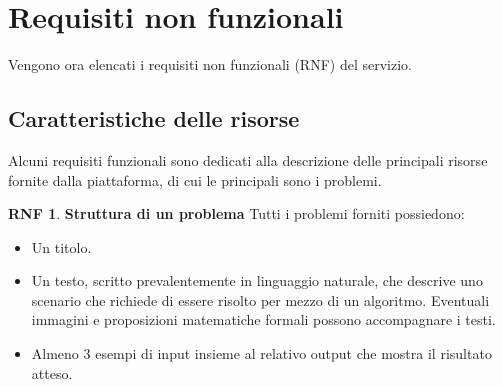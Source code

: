 \documentclass[11pt, a4paper]{article}
\theoremstyle{definition}
\newtheorem{nonfuncreq}{RNF} %
\begin{document}
\newpage
\section{Requisiti non funzionali}
Vengono ora elencati i requisiti non funzionali (RNF) del servizio.

\subsection{Caratteristiche delle risorse}
Alcuni requisiti funzionali sono dedicati alla descrizione delle principali
risorse fornite dalla piattaforma, di cui le principali sono i problemi.

\begin{nonfuncreq}
\label{formatoproblema}
\textbf{Struttura di un problema }
Tutti i problemi forniti possiedono:
\begin{itemize}
    \item Un titolo.

    \item Un testo, scritto prevalentemente in linguaggio naturale,
    che descrive uno scenario che richiede di essere risolto per mezzo
    di un algoritmo. Eventuali immagini e proposizioni matematiche
    formali possono accompagnare i testi.

    \item Almeno 3 esempi di input insieme al relativo output che
    mostra il risultato atteso.
\end{itemize}
\end{nonfuncreq}
\end{document}
